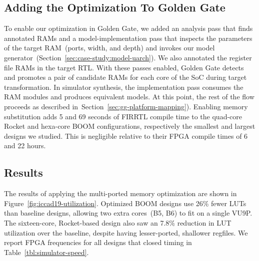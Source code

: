 
\subsection{Adding the Optimization To Golden Gate}

To enable our optimization in Golden Gate, we added an analysis pass that finds annotated
RAMs and a model-implementation pass that inspects the
parameters of the target RAM~(ports, width, and depth) and invokes our
model generator~(Section~\ref{sec:case-study:model-uarch}). We also annotated the register file RAMs in the target RTL.
With these passes enabled, Golden Gate detects and promotes a pair of candidate RAMs for
each core of the SoC during target transformation. In simulator synthesis, the implementation pass consumes the RAM modules
and produces equivalent models. At this point, the rest of the flow proceeds as described
in~Section~\ref{sec:gg-platform-mapping}).
Enabling memory substitution adds 5 and 69 seconds of FIRRTL compile time to the quad-core Rocket
and hexa-core BOOM configurations, respectively the smallest and largest designs we studied. This is negligible
relative to their FPGA compile times of 6 and 22 hours.

\subsection{Results}
The results of applying the multi-ported memory optimization are shown in
Figure~\ref{fig:iccad19-utilization}. Optimized BOOM designs use 26\% fewer LUTs than baseline designs, 
allowing two extra cores~(B5, B6) to fit on a single VU9P.
The sixteen-core, Rocket-based design also saw an 7.8\% reduction in LUT utilization over the baseline, despite
having lesser-ported, shallower regfiles. We report FPGA frequencies for all designs that closed timing
in Table~\ref{tbl:simulator-speed}.

